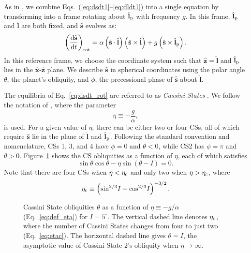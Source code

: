 \documentclass[
        fleqn,
        usenatbib,
    ]{mnras}
\newcommand*{\rd}[2]{\frac{\mathrm{d}#1}{\mathrm{d}#2}}
\newcommand*{\p}[1]{\left(#1\right)}
\newcommand*{\uv}[1]{\hat{\mathbf{#1}}}
\begin{document}
As in \citet{su2020}, we combine Eqs.~(\ref{eq:dsdt1}--\ref{eq:dldt1}) into a
single equation by transforming into a frame rotating about $\uv{l}_{\rm p}$
with frequency $g$. In this frame, $\uv{l}_{\rm p}$ and $\uv{l}$ are both fixed,
and $\uv{s}$ evolves as:
\begin{equation}
    \p{\rd{\uv{s}}{t}}_{\rm rot}
        = \alpha\p{\uv{s} \cdot \uv{l}}\p{\uv{s} \times \uv{l}}
            + g\p{\uv{s} \times \uv{l}_{\rm p}}. \label{eq:dsdt_rot}
\end{equation}
In this reference frame, we choose the coordinate system such that $\uv{z} =
\uv{l}$ and $\uv{l}_{\rm p}$ lies in the $\uv{x}$-$\uv{z}$ plane. We describe
$\uv{s}$ in spherical coordinates using the polar angle $\theta$, the planet's
obliquity, and $\phi$, the precessional phase of $\uv{s}$ about $\uv{l}$.

The equilibria of Eq.~\eqref{eq:dsdt_rot} are referred to as \emph{Cassini
States} \citep[CSs;][]{colombo1966, peale1969}. We follow the notation of
\citet{su2020}, where the parameter
\begin{equation}
    \eta \equiv -\frac{g}{\alpha},\label{eq:def_eta}
\end{equation}
is used. For a given value of $\eta$, there can be either two or four CSs, all
of which require $\uv{s}$ lie in the plane of $\uv{l}$ and $\uv{l}_{\rm p}$.
Following the standard convention and nomenclature, CSs 1, 3, and 4 have $\phi =
0$ and $\theta < 0$, while CS2 has $\phi = \pi$ and $\theta > 0$.
Figure~\ref{fig:cs_locs} shows the CS obliquities as a function of $\eta$, each
of which satisfies
\begin{equation}
    \sin \theta \cos \theta - \eta \sin\p{\theta - I} = 0.\label{eq:cs_zero}
\end{equation}
Note that there are four CSs when $\eta < \eta_{\rm c}$ and only two when $\eta
> \eta_{\rm c}$, where
\begin{equation}
    \eta_{\rm c} \equiv \p{\sin^{2/3}\!I + \cos^{2/3}\!I}^{-3/2}.\label{eq:etac}
\end{equation}
\begin{figure}
    \centering
    \caption{Cassini State obliquities $\theta$ as a function of $\eta \equiv
    -g/\alpha$ (Eq.~\ref{eq:def_eta}) for $I = 5^\circ$. The vertical dashed
    line denotes $\eta_{\rm c}$, where the number of Cassini States changes from
    four to just two (Eq.~\ref{eq:etac}). The horizontal dashed line gives
    $\theta = I$, the asymptotic value of Cassini State 2's obliquity when $\eta
    \to \infty$.}\label{fig:cs_locs}
\end{figure}
\end{document}
